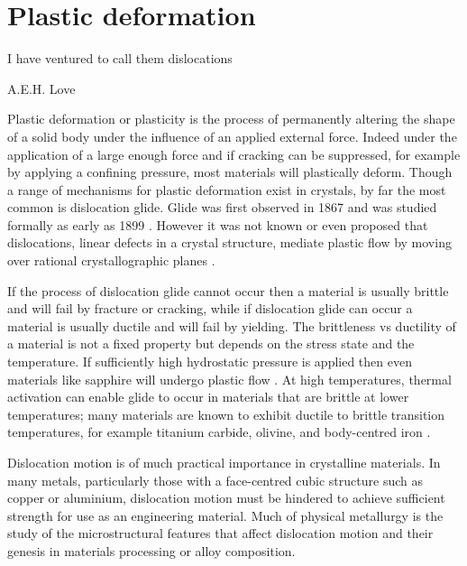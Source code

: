
\chapter{Plastic deformation}  %
\label{chap:plastic_deformation}

\epigraph{I have ventured to call them dislocations}{A.E.H. Love}




\graphicspath{{plastic_deformation/Figs/}}

Plastic deformation or plasticity is the process of permanently altering the shape of a solid body under the influence of an applied external force. Indeed under the application of a large enough force and if cracking can be suppressed, for example by applying a confining pressure, most materials will plastically deform. Though a range of mechanisms for plastic deformation exist in crystals, by far the most common is dislocation glide. Glide was first observed in 1867 \cite{Reusch1867} and was studied formally as early as 1899 \cite{Ewing1899,Ewing1900}. However it was not known or even proposed that dislocations, linear defects in a crystal structure, mediate plastic flow by moving over rational crystallographic planes \cite{Kelly2012ch7}.

If the process of dislocation glide cannot occur then a material is usually {brittle} and will fail by fracture or cracking, while if dislocation glide can occur a material is usually {ductile} and will fail by yielding. The brittleness vs ductility of a material is not a fixed property but depends on the stress state and the temperature. If sufficiently high hydrostatic pressure is applied then even materials like sapphire will undergo plastic flow \cite{Bridgman1947}. At high temperatures, thermal activation can enable glide to occur in materials that are brittle at lower temperatures; many  materials are known to exhibit ductile to brittle transition temperatures, for example titanium carbide, olivine, and body-centred iron \cite{Kelly2012ch7,frost1982,Rowcliffe1971,Darot1985}.

Dislocation motion is of much practical importance in crystalline materials. In many metals, particularly those with a face-centred cubic structure such as copper or aluminium, dislocation motion must be hindered to achieve sufficient strength for use as an engineering material. Much of physical metallurgy is the study of the microstructural features that affect dislocation motion and their genesis in materials processing or alloy composition.

